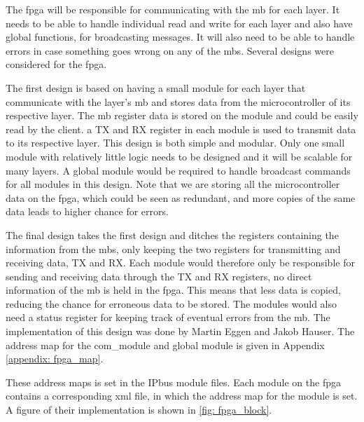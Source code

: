 \documentclass[main.tex]{subfiles}
\begin{document}
The \gls{fpga} will be responsible for communicating with the \gls{mb} for each layer. It needs to be able to handle individual read and write for each layer and also have global functions, for broadcasting messages. It will also need to be able to handle errors in case something goes wrong on any of the \gls{mb}s. Several designs were considered for the \gls{fpga}.

The first design is based on having a small module for each layer that communicate with the layer's \gls{mb} and stores data from the microcontroller of its respective layer. The \gls{mb} register data is stored on the module and could be easily read by the client. a TX and RX register in each module is used to transmit data to its respective layer. This design is both simple and modular. Only one small module with relatively little logic needs to be designed and it will be scalable for many layers. A global module would be required to handle broadcast commands for all modules in this design. Note that we are storing all the microcontroller data on the \gls{fpga}, which could be seen as redundant, and more copies of the same data leads to higher chance for errors.

The final design takes the first design and ditches the registers containing the information from the \gls{mb}s, only keeping the two registers for transmitting and receiving data, TX and RX. Each module would therefore only be responsible for sending and receiving data through the TX and RX registers, no direct information of the \gls{mb} is held in the \gls{fpga}. This means that less data is copied, reducing the chance for erroneous data to be stored. The modules would also need a status register for keeping track of eventual errors from the \gls{mb}. The implementation of this design was done by Martin Eggen and Jakob Hauser. The address map for the com\_module and global module is given in Appendix \ref{appendix: fpga_map}. 

These address maps is set in the IPbus module files. Each module on the \gls{fpga} contains a corresponding xml file, in which the address map for the module is set. A figure of their implementation is shown in \autoref{fig: fpga_block}.
\end{document}
